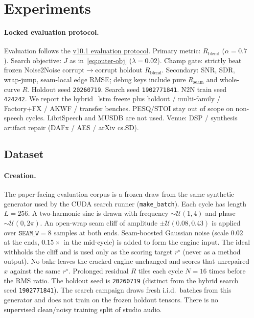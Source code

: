 \section{Experiments}
\label{sec:experiments}

\paragraph{Locked evaluation protocol.}
Evaluation follows the \href{https://github.com/reeldemo/denoise-opt-meta/blob/master/paper/Unsupervised_Wavetable_Seam_Artifact_Repair_via_Hybrid_GA-PPO_Meta-Search_v10/EVAL_PROTOCOL.md}{v10.1 evaluation protocol}.
Primary metric: $R_{\mathrm{blend}}$ ($\alpha{=}0.7$).
Search objective: $J$ as in~\eqref{eq:outer-obj} ($\lambda{=}0.02$).
Champ gate: strictly beat frozen Noise2Noise corrupt$\to$corrupt holdout $R_{\mathrm{blend}}$.
Secondary: SNR, SDR, wrap-jump, seam-local edge RMSE; debug keys include pure $R_{\mathrm{seam}}$ and whole-curve $R$.
Holdout seed \texttt{20260719}. Search seed \texttt{1902771841}. N2N train seed \texttt{424242}.
We report the hybrid\_lstm freeze plus holdout / multi-family / Factory+FX / AKWF / transfer benches.
PESQ/STOI stay out of scope on non-speech cycles. LibriSpeech and MUSDB are not used.
Venue: DSP / synthesis artifact repair (DAFx / AES / arXiv cs.SD).

\subsection{Dataset}
\label{sec:dataset}

\paragraph{Creation.}
The paper-facing evaluation corpus is a frozen draw from the same synthetic generator used by the CUDA search runner (\texttt{make\_batch}).
Each cycle has length $L{=}256$.
A two-harmonic sine is drawn with frequency $\sim\mathcal{U}(1,4)$ and phase $\sim\mathcal{U}(0,2\pi)$.
An open-wrap seam cliff of amplitude $\pm\mathcal{U}(0.08,0.43)$ is applied over $\texttt{SEAM\_W}{=}8$ samples at both ends.
Seam-boosted Gaussian noise (scale $0.02$ at the ends, $0.15\times$ in the mid-cycle) is added to form the engine input.
The ideal withholds the cliff and is used only as the scoring target $r^{\star}$ (never as a method output).
No-bake leaves the cracked engine unchanged and scores that unrepaired $x$ against the same $r^{\star}$.
Prolonged residual $R$ tiles each cycle $N{=}16$ times before the RMS ratio.
The holdout seed is \texttt{20260719} (distinct from the hybrid search seed \texttt{1902771841}).
The search campaign draws fresh i.i.d.\ batches from this generator and does not train on the frozen holdout tensors.
There is no supervised clean/noisy training split of studio audio.

